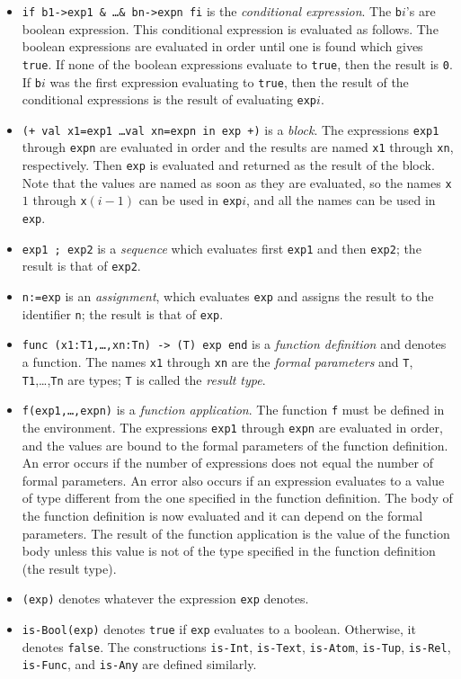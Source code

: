 \documentclass[a4,14pt,latin1]{article}
\begin{document}
\begin{itemize}
\item
{\tt if b1->exp1 \& \ldots \& bn->expn fi} is the {\em conditional expression}.
The {\tt b}$i$'s are boolean expression. This conditional expression
is evaluated as follows. The boolean expressions are evaluated in order
until one is found which gives {\tt true}. If none of the boolean expressions
evaluate to {\tt true}, then the result is \verb"0". If {\tt b}$i$ was the first
expression evaluating to {\tt true},
then the result of the conditional expressions is the
result of evaluating {\tt exp}$i$.
\item
{\tt (+ val x1=exp1 \ldots val xn=expn in exp +)} is a {\em block}. The
expressions {\tt exp1} through {\tt expn} are evaluated in order and the
results are named {\tt x1} through {\tt xn}, respectively.
Then {\tt exp} is evaluated and returned as the result of the block.
Note that the values are named as soon as they are evaluated,
so the names {\tt x}$1$ through {\tt x}$(i-1)$ can be used in {\tt exp}$i$,
and all the names can be used in {\tt exp}.
\item
{\tt exp1 ; exp2} is a {\em sequence} which evaluates first \verb"exp1"
and then \verb"exp2"; the result is that of \verb"exp2".
\item
{\tt n:=exp} is an {\em assignment}, which evaluates \verb"exp" and assigns
the result to the identifier \verb"n"; the result is that of \verb"exp".
\item
{\tt func (x1:T1,\ldots,xn:Tn) -> (T) exp end} is a {\em function definition\/}
and denotes a function. The names {\tt x1} through {\tt xn} are the
{\em formal parameters} and
{\tt T}, {\tt T1},\ldots,{\tt Tn} are types;
{\tt T} is called the {\em result type}.

\item
{\tt f(exp1,\ldots,expn)} is a {\em function application}. The function {\tt f}
must be defined in the environment.
The expressions {\tt exp1} through {\tt expn} are evaluated in order, and the
values are bound to the formal parameters of the function definition.
An error occurs if the number of expressions does not equal the number of
formal parameters. An error also occurs if an expression evaluates to a value
of type different from the one specified in the function definition.
The body of the function definition is now evaluated and it can depend on the
formal parameters. The result of the function application is the value
of the function body unless this value is not of the type specified in
the function definition (the result type).
\item
{\tt (exp)} denotes whatever the expression {\tt exp} denotes.
\item
{\tt is-Bool(exp)} denotes {\tt true} if {\tt exp} evaluates to a
boolean. Otherwise, it denotes {\tt false}. The constructions
{\tt is-Int}, {\tt is-Text}, {\tt is-Atom}, {\tt is-Tup}, {\tt is-Rel},
{\tt is-Func}, and {\tt is-Any} are defined similarly.


\end{itemize}
\end{document}
